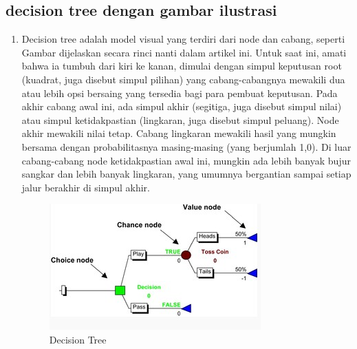\begin{enumerate}
\begin{enumerate}
\begin{enumerate}
\begin{enumerate}
\subsection{decision tree dengan gambar ilustrasi}
\begin{enumerate}
\item Decision tree adalah model visual yang terdiri dari node dan cabang, seperti Gambar dijelaskan secara rinci nanti dalam artikel ini. Untuk saat ini, amati bahwa ia tumbuh dari kiri ke kanan, dimulai dengan simpul keputusan root (kuadrat, juga disebut simpul pilihan) yang cabang-cabangnya mewakili dua atau lebih opsi bersaing yang tersedia bagi para pembuat keputusan. Pada akhir cabang awal ini, ada simpul akhir (segitiga, juga disebut simpul nilai) atau simpul ketidakpastian (lingkaran, juga disebut simpul peluang). Node akhir mewakili nilai tetap. Cabang lingkaran mewakili hasil yang mungkin bersama dengan probabilitasnya masing-masing (yang berjumlah 1,0). Di luar cabang-cabang node ketidakpastian awal ini, mungkin ada lebih banyak bujur sangkar dan lebih banyak lingkaran, yang umumnya bergantian sampai setiap jalur berakhir di simpul akhir.
\begin{figure}[ht]
\centering
\includegraphics[scale=0.5]{figures/f6.jpg}
\caption{Decision Tree}
\label{contoh}
\end{figure}


\end{enumerate}
\end{enumerate}
\end{enumerate}
\end{enumerate}
\end{enumerate}
